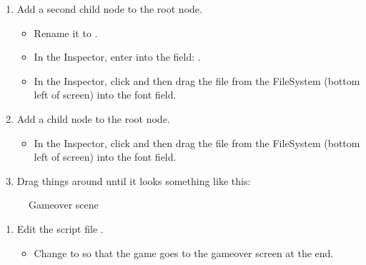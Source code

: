 \documentclass[a4paper,12pt,english]{sphinxmanual}
\begin{document}
\begin{sphinxVerbatim}[commandchars=\\\{\}]

  
\end{sphinxVerbatim}
\begin{enumerate}
%
\setcounter{enumi}{5}
\item {} 
\sphinxAtStartPar
Add a second  child node to the root node.
\begin{itemize}
\item {} 
\sphinxAtStartPar
Rename it to .

\item {} 
\sphinxAtStartPar
In the Inspector, enter into the  field: .

\item {} 
\sphinxAtStartPar
In the Inspector, click  and then drag the
 file from the FileSystem (bottom left of screen)
into the \sphinxstylestrong{{[}empty{]}} font field.

\end{itemize}

\item {} 
\sphinxAtStartPar
Add a  child node to the root node.
\begin{itemize}
\item {} 
\sphinxAtStartPar
In the Inspector, click  and then drag the
 file from the FileSystem (bottom left of screen)
into the \sphinxstylestrong{{[}empty{]}} font field.

\end{itemize}

\item {} 
\sphinxAtStartPar
Drag things around until it looks something like this:

\end{enumerate}

\begin{figure}[htbp]
\centering
\capstart

\noindent{}
\caption{Gameover scene}\label{\detokenize{tutorial:id6}}\end{figure}
\begin{enumerate}
%
\setcounter{enumi}{8}
\item {} 
\sphinxAtStartPar
Edit the script file .
\begin{itemize}
\item {} 
\sphinxAtStartPar
Change  to 
so that the game goes to the gameover screen at the end.

\end{itemize}

\end{enumerate}
\end{document}

